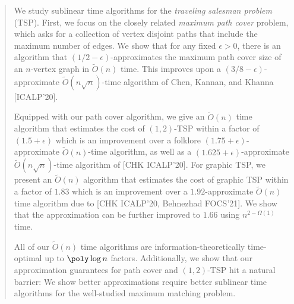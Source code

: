 \begin{abstract}
We study sublinear time algorithms for the {\em traveling salesman problem} (TSP). First, we focus on the closely related {\em maximum path cover} problem, which asks for a collection of vertex disjoint paths that include the maximum number of edges. We show that for any fixed $\epsilon > 0$, there is an algorithm that $(1/2 - \epsilon)$-approximates the maximum path cover size of an $n$-vertex graph in $\widetilde{O}(n)$ time. This improves upon a $(3/8-\epsilon)$-approximate $\widetilde{O}(n \sqrt{n})$-time algorithm of Chen, Kannan, and Khanna [ICALP'20].
    
    \medskip
    Equipped with our path cover algorithm, we give an $\widetilde{O}(n)$ time algorithm that estimates the cost of $(1,2)$-TSP within a factor of $(1.5+\epsilon)$ which is an improvement over a folklore $(1.75 + \epsilon)$-approximate $\widetilde{O}(n)$-time algorithm, as well as a $(1.625+\epsilon)$-approximate $\widetilde{O}(n\sqrt{n})$-time algorithm of [CHK ICALP'20]. For graphic TSP, we present an $\widetilde{O}(n)$ algorithm that estimates the cost of graphic TSP within a factor of $1.83$ which is an improvement over a $1.92$-approximate $\widetilde{O}(n)$ time algorithm due to [CHK ICALP'20, Behnezhad FOCS'21]. We show that the approximation can be further improved to $1.66$ using $n^{2-\Omega(1)}$ time.
    
    \medskip    
    All of our $\widetilde{O}(n)$ time algorithms are information-theoretically time-optimal up to $\poly\log n$ factors. Additionally, we show that our approximation guarantees for path cover and $(1,2)$-TSP hit a natural barrier: We show better approximations require better sublinear time algorithms for the well-studied maximum matching problem.
\end{abstract}
